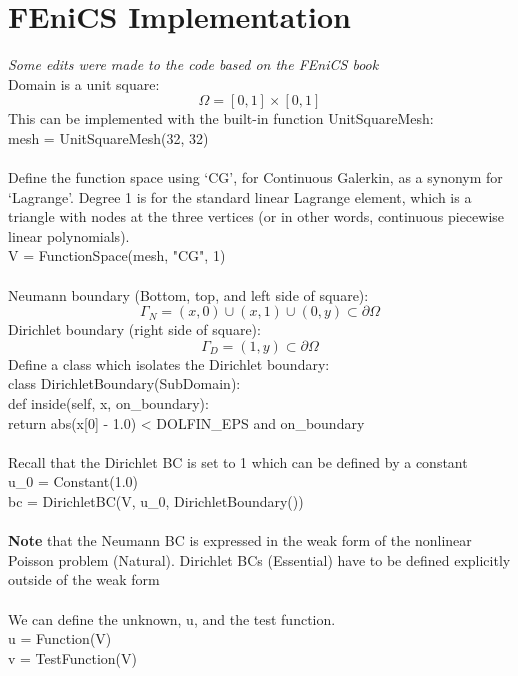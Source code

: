 \documentclass[12pt,3p]{article}
\begin{document}
\section{FEniCS Implementation}
\textit{Some edits were made to the code based on the FEniCS book} \\
Domain is a unit square: 
\[ \Omega = [0,1] \times [0,1] \] 
This can be implemented with the built-in function UnitSquareMesh: \\
{\selectfont
mesh = UnitSquareMesh(32, 32) \\  \\ 
}
Define the function space using ‘CG’, for Continuous Galerkin, as a synonym for ‘Lagrange’. Degree 1 is for the standard linear Lagrange element, which is a triangle with nodes at the three vertices (or in other words, continuous piecewise linear polynomials). \\
{\selectfont
V = FunctionSpace(mesh, "CG", 1) \\ \\
}
Neumann boundary (Bottom, top, and left side of square):
\[ \Gamma_N =  {(x,0) \cup (x,1) \cup (0,y) \subset \partial \Omega } \]
Dirichlet boundary (right side of square):
\[ \Gamma_D = {(1,y) \subset \partial \Omega } \]
Define a class which isolates the Dirichlet boundary: \\
{\selectfont
class DirichletBoundary(SubDomain): \\
\indent def inside(self, x, on\_boundary): \\
\indent \indent return abs(x[0] - 1.0) < DOLFIN\_EPS and on\_boundary \\ \\
}
Recall that the Dirichlet BC is set to 1 which can be defined by a constant \\ 
{\selectfont
u\_0 = Constant(1.0) \\
bc = DirichletBC(V, u\_0, DirichletBoundary()) \\ \\
}
\textbf{Note} that the Neumann BC is expressed in the weak form of the nonlinear Poisson problem (Natural). Dirichlet BCs (Essential) have to be defined explicitly outside of the weak form \\ \\
We can define the unknown, u, and the test function. \\
{\selectfont
u = Function(V) \\
v = TestFunction(V) \\ \\ 
}
\end{document}
